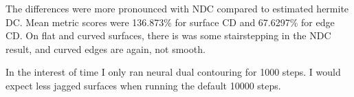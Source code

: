\documentclass[12pt,letterpaper]{article}
\begin{document}
The differences were more pronounced with NDC compared to estimated hermite DC. Mean metric scores were
136.873\% for surface CD and 67.6297\% for edge CD. On flat and curved surfaces, there is was some stairstepping in the NDC result, and curved edges are again, not smooth.

In the interest of time I only ran neural dual contouring for 1000 steps. I would expect less jagged surfaces when running the default 10000 steps.



\clearpage
\end{document}
